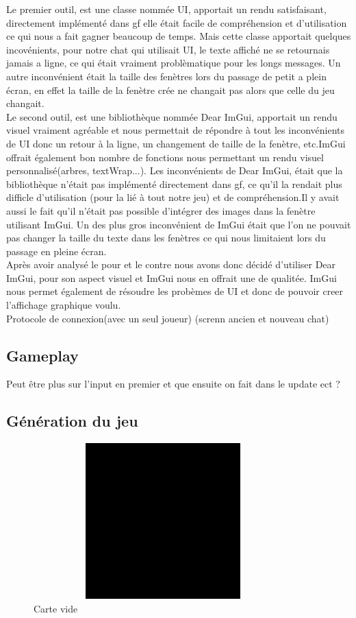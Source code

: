 \documentclass[a4paper, 12pt]{article}
\begin{document}
Le premier outil, est une classe nommée UI, apportait un rendu satisfaisant, directement implémenté dans gf elle était facile de compréhension et d'utilisation ce qui nous a fait gagner beaucoup de temps.
Mais cette classe apportait quelques incovénients, pour notre chat qui utilisait UI, le texte affiché
ne se retournais jamais a ligne, ce qui était vraiment problèmatique pour les
longs messages. Un autre inconvénient était la taille des fenètres lors du passage de petit a plein écran, en effet la taille de la fenètre crée ne changait pas alors que celle du jeu changait.
\\Le second outil, est une bibliothèque nommée Dear ImGui, apportait un rendu visuel vraiment agréable et nous permettait de répondre à tout les inconvénients de UI donc un retour à la ligne, un changement de taille de la fenètre, etc.ImGui offrait également bon nombre de fonctions nous permettant un rendu visuel personnalisé(arbres, textWrap...).
Les inconvénients de Dear ImGui, était que la bibliothèque n'était pas implémenté directement dans gf, ce qu'il la rendait plus difficle d'utilisation (pour la lié à tout notre jeu) et de compréhension.Il y avait aussi le fait qu'il n'était pas possible d'intégrer des images dans la fenètre utilisant ImGui. Un des plus gros inconvénient de ImGui était que l'on ne pouvait pas changer la taille du texte dans les fenètres ce qui nous limitaient lors du passage en pleine écran.\\

Après avoir analysé le pour et le contre nous avons donc décidé d'utiliser Dear ImGui, pour son aspect visuel et ImGui nous en offrait une de qualitée. ImGui nous permet également de résoudre les probèmes de UI et donc de pouvoir creer l'affichage graphique voulu.
\\
Protocole de connexion(avec un seul joueur)
(screnn ancien et nouveau chat)
\newpage
\subsection{Gameplay}
Peut être plus sur l’input en premier et que ensuite on fait dans le update ect ?
\newpage
\subsection{Génération du jeu}

\begin{figure}
\center
\includegraphics[width=10cm,height=6cm]{./Procedural/void}
\caption{Carte vide}
\label{vide}
\end{figure}
\end{document}
